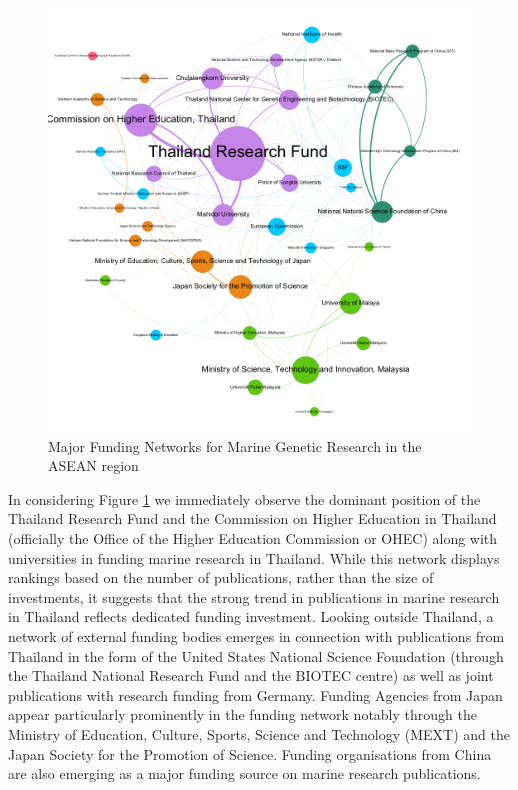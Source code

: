 \documentclass[openany]{book}
\theoremstyle{definition}
\theoremstyle{definition}
\theoremstyle{definition}
\theoremstyle{remark}
\begin{document}
\begin{figure}

{\centering \includegraphics[width=1\linewidth]{images/aseanmarinlit_fundingnetwork} 

}

\caption{Major Funding Networks for Marine Genetic Research in the ASEAN region}\label{fig:fundingnetwork}
\end{figure}

In considering Figure \ref{fig:fundingnetwork} we immediately observe
the dominant position of the Thailand Research Fund and the Commission
on Higher Education in Thailand (officially the Office of the Higher
Education Commission or OHEC) along with universities in funding marine
research in Thailand. While this network displays rankings based on the
number of publications, rather than the size of investments, it suggests
that the strong trend in publications in marine research in Thailand
reflects dedicated funding investment. Looking outside Thailand, a
network of external funding bodies emerges in connection with
publications from Thailand in the form of the United States National
Science Foundation (through the Thailand National Research Fund and the
BIOTEC centre) as well as joint publications with research funding from
Germany. Funding Agencies from Japan appear particularly prominently in
the funding network notably through the Ministry of Education, Culture,
Sports, Science and Technology (MEXT) and the Japan Society for the
Promotion of Science. Funding organisations from China are also emerging
as a major funding source on marine research publications.
\end{document}
